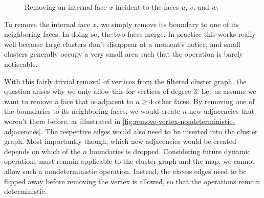 \begin{figure}[H]
	\centering
	\quad
	\caption{Removing an internal face $x$ incident to the faces $u$, $v$, and $w$.}
	\label{fig:remove-vertex-illustration}
\end{figure}

To remove the internal face $x$, we simply remove its boundary to one of its neighboring faces.
In doing so, the two faces merge.
In practice this works really well because large clusters don't disappear at a moment's notice, and small clusters generally occupy a very small area such that the operation is barely noticeable.

With this fairly trivial removal of vertices from the filtered cluster graph, the question arises why we only allow this for vertices of degree 3.
Let us assume we want to remove a face that is adjacent to $n \geq 4$ other faces.
By removing one of the boundaries to its neighboring faces, we would create $n$ new adjacencies that weren't there before, as illustrated in \cref{fig:remove-vertex-nondeterministic-adjacencies}.
The respective edges would also need to be inserted into the cluster graph.
Most importantly though, which new adjacencies would be created depends on which of the $n$ boundaries is dropped.
Considering future dynamic operations must remain applicable to the cluster graph and the map, we cannot allow such a nondeterministic operation.
Instead, the excess edges need to be flipped away before removing the vertex is allowed, so that the operations remain deterministic.

